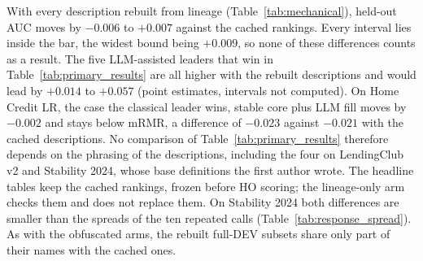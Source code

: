 \documentclass[final,5p,twocolumn]{elsarticle}
\begin{document}
With every description rebuilt from lineage (Table~\ref{tab:mechanical}), held-out AUC moves by $-0.006$ to $+0.007$ against the cached rankings. Every interval lies inside the bar, the widest bound being $+0.009$, so none of these differences counts as a result. The five LLM-assisted leaders that win in Table~\ref{tab:primary_results} are all higher with the rebuilt descriptions and would lead by $+0.014$ to $+0.057$ (point estimates, intervals not computed). On Home Credit LR, the case the classical leader wins, stable core plus LLM fill moves by $-0.002$ and stays below mRMR, a difference of $-0.023$ against $-0.021$ with the cached descriptions. No comparison of Table~\ref{tab:primary_results} therefore depends on the phrasing of the descriptions, including the four on LendingClub v2 and Stability 2024, whose base definitions the first author wrote. The headline tables keep the cached rankings, frozen before HO scoring; the lineage-only arm checks them and does not replace them. On Stability 2024 both differences are smaller than the spreads of the ten repeated calls (Table~\ref{tab:response_spread}). As with the obfuscated arms, the rebuilt full-DEV subsets share only part of their names with the cached ones.
\end{document}
